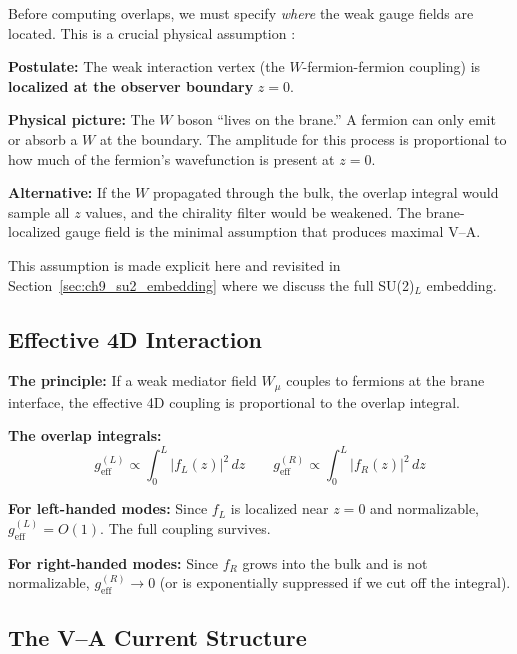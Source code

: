 Before computing overlaps, we must specify \emph{where} the weak gauge fields
are located. This is a crucial physical assumption \tagP{}:

\begin{tcolorbox}[colback=orange!5, colframe=orange!50!black,
    title=\textbf{Interaction Locality Assumption [P]}]
\textbf{Postulate:} The weak interaction vertex (the $W$-fermion-fermion coupling)
is \textbf{localized at the observer boundary} $z = 0$.

\textbf{Physical picture:} The $W$ boson ``lives on the brane.'' A fermion can
only emit or absorb a $W$ at the boundary. The amplitude for this process is
proportional to how much of the fermion's wavefunction is present at $z = 0$.

\textbf{Alternative:} If the $W$ propagated through the bulk, the overlap integral
would sample all $z$ values, and the chirality filter would be weakened. The
brane-localized gauge field is the minimal assumption that produces maximal V--A.
\end{tcolorbox}

This assumption is made explicit here and revisited in Section~\ref{sec:ch9_su2_embedding}
where we discuss the full SU(2)$_L$ embedding.

\subsection{Effective 4D Interaction}

\textbf{The principle:} If a weak mediator field $W_\mu$ couples to fermions at
the brane interface, the effective 4D coupling is proportional to the overlap integral.

\textbf{The overlap integrals:}
\begin{equation}
    g_{\text{eff}}^{(L)} \propto \int_0^L |f_L(z)|^2 \, dz
    \qquad
    g_{\text{eff}}^{(R)} \propto \int_0^L |f_R(z)|^2 \, dz
    \label{eq:ch9_overlap}
\end{equation}

\textbf{For left-handed modes:} Since $f_L$ is localized near $z=0$ and
normalizable, $g_{\text{eff}}^{(L)} = O(1)$. The full coupling survives.

\textbf{For right-handed modes:} Since $f_R$ grows into the bulk and is not
normalizable, $g_{\text{eff}}^{(R)} \to 0$ (or is exponentially suppressed if
we cut off the integral).

\subsection{The V–A Current Structure}

